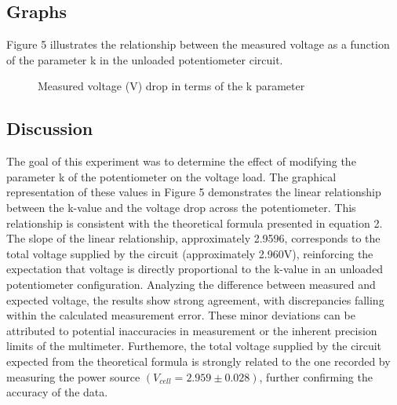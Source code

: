 \documentclass[a4paper]{article}
\newcommand{\unit}[1]{~\mathrm{#1}}
\begin{document}
\subsection{Graphs}
Figure 5 illustrates the relationship between the measured voltage as a function of the parameter 
k in the unloaded potentiometer circuit.
\begin{figure}[!ht]
    \centering
    \caption{Measured voltage (V) drop in terms of the k parameter}
    \label{fig:3}
\end{figure}

\subsection{Discussion}
The goal of this experiment was to determine the effect of modifying
the parameter k of the potentiometer on the voltage load. 
The graphical representation of these values in Figure 5 demonstrates
the linear relationship between the k-value and the voltage drop across the potentiometer.
This relationship is consistent with the theoretical formula presented in equation 2.
The slope of the linear relationship, approximately 2.9596, corresponds
to the total voltage supplied by the circuit (approximately 2.960V),
reinforcing the expectation that voltage is directly proportional to the
k-value in an unloaded potentiometer configuration.
Analyzing the difference between measured and expected voltage, 
the results show strong agreement,
with discrepancies falling within the calculated measurement error. 
These minor deviations can be attributed to potential inaccuracies
in measurement or the inherent precision limits of the multimeter.
Furthemore, the total voltage supplied by the circuit 
expected from the theoretical formula is strongly related to the one recorded
by measuring the power source $(V_{cell} = 2.959 \pm 0.028)$, further confirming the accuracy of the data.
\newpage
\end{document}
